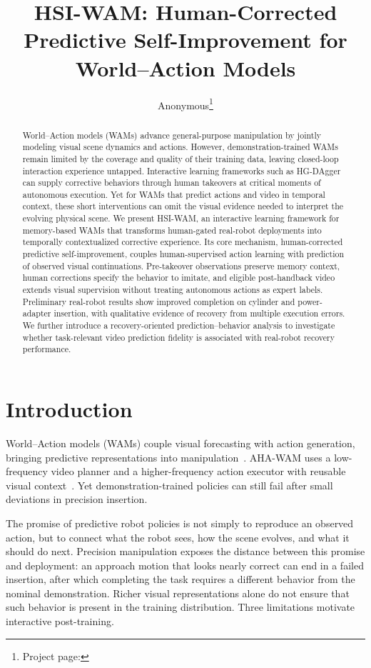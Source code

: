 \documentclass[letterpaper,10pt,conference]{ieeeconf}
\title{HSI-WAM: Human-Corrected Predictive Self-Improvement for World--Action Models}
\author{Anonymous\thanks{Project page:
\hrefurl{https://anonymous.4open.science/w/beyond-takeover-page-BE4F/}}}
\begin{document}
\maketitle
\thispagestyle{empty}
\pagestyle{empty}

\begin{abstract}
World--Action models (WAMs) advance general-purpose manipulation by jointly modeling visual scene dynamics and actions. However, demonstration-trained WAMs remain limited by the coverage and quality of their training data, leaving closed-loop interaction experience untapped. Interactive learning frameworks such as HG-DAgger can supply corrective behaviors through human takeovers at critical moments of autonomous execution. Yet for WAMs that predict actions and video in temporal context, these short interventions can omit the visual evidence needed to interpret the evolving physical scene. We present HSI-WAM, an interactive learning framework for memory-based WAMs that transforms human-gated real-robot deployments into temporally contextualized corrective experience. Its core mechanism, human-corrected predictive self-improvement, couples human-supervised action learning with prediction of observed visual continuations. Pre-takeover observations preserve memory context, human corrections specify the behavior to imitate, and eligible post-handback video extends visual supervision without treating autonomous actions as expert labels. Preliminary real-robot results show improved completion on cylinder and power-adapter insertion, with qualitative evidence of recovery from multiple execution errors. We further introduce a recovery-oriented prediction--behavior analysis to investigate whether task-relevant video prediction fidelity is associated with real-robot recovery performance.
\end{abstract}

\section{Introduction}
World--Action models (WAMs) couple visual forecasting with action generation, bringing predictive representations into manipulation~\cite{videovla,ahawam}. AHA-WAM uses a low-frequency video planner and a higher-frequency action executor with reusable visual context~\cite{ahawam}. Yet demonstration-trained policies can still fail after small deviations in precision insertion.

The promise of predictive robot policies is not simply to reproduce an observed action, but to connect what the robot sees, how the scene evolves, and what it should do next. Precision manipulation exposes the distance between this promise and deployment: an approach motion that looks nearly correct can end in a failed insertion, after which completing the task requires a different behavior from the nominal demonstration. Richer visual representations alone do not ensure that such behavior is present in the training distribution. Three limitations motivate interactive post-training.
\end{document}
